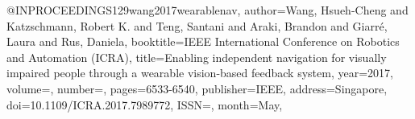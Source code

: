 @INPROCEEDINGS{129wang2017wearablenav,
author={Wang, Hsueh-Cheng and Katzschmann, Robert K. and Teng, Santani and Araki, Brandon and Giarré, Laura and Rus, Daniela},
booktitle={IEEE International Conference on Robotics and Automation (ICRA)}, 
title={Enabling independent navigation for visually impaired people through a wearable vision-based feedback system}, 
year={2017},
volume={},
number={},
pages={6533-6540},
publisher={IEEE},
address={Singapore},
doi={10.1109/ICRA.2017.7989772},
ISSN={},
month={May},}